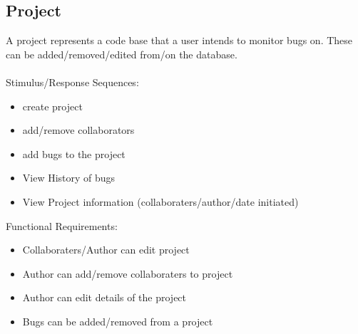 \documentclass{article}
\begin{document}
\subsection{Project}
A project represents a code base that a user intends to monitor bugs on. These can be added/removed/edited from/on the \gls{database}.
\\ \\
Stimulus/Response Sequences:
\begin{itemize}
\item create project
\item add/remove collaborators
\item add bugs to the project
\item View History of bugs
\item View Project information (collaboraters/author/date initiated)
\end{itemize}
Functional Requirements:
\begin{itemize}
\item Collaboraters/Author can edit project
\item Author can add/remove collaboraters to project
\item Author can edit details of the project
\item Bugs can be added/removed from a project
\end{itemize}
\end{document}
